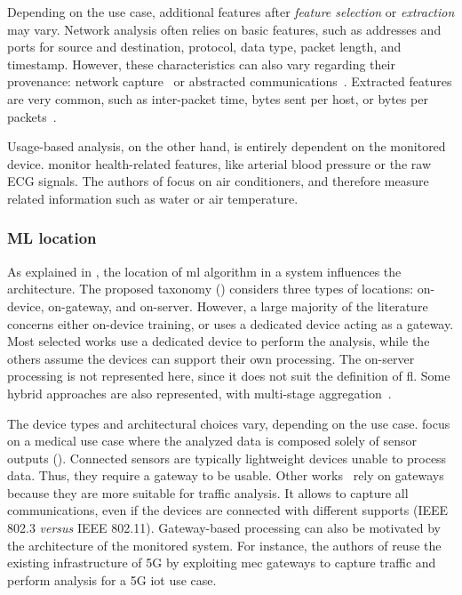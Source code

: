 Depending on the use case, additional features after \emph{feature selection} or \emph{extraction} may vary.
Network analysis often relies on basic features, such as addresses and ports for source and destination, protocol, data type, packet length, and timestamp.
However, these characteristics can also vary regarding their provenance: network capture~\cite{kddcup99,tavallaee_detailedanalysisKDD_2009} or abstracted communications~\cite{pahl_AllEyesYou_2018}.
Extracted features are very common, such as inter-packet time, bytes sent per host, or bytes per packets~\cite{Buczak2016,Chaabouni2019}.

Usage-based analysis, on the other hand, is entirely dependent on the monitored device.
\textcite{schneble_Attackdetectionusing_2019} monitor health-related features, like arterial blood pressure or the raw ECG signals.
The authors of \cite{zhang_BlockchainbasedFederatedLearning_2020} focus on air conditioners, and therefore measure related information such as water or air temperature.

\subsubsection{ML location}
\label{sec:sota.quali.location}

As explained in , the location of \gls{ml} algorithm in a system influences the architecture.
The proposed taxonomy () considers three types of locations: on-device, on-gateway, and on-server.
However, a large majority of the literature concerns either on-device training, or uses a dedicated device acting as a gateway.
Most selected works use a dedicated device to perform the analysis, while the others assume the devices can support their own processing.
The on-server processing is not represented here, since it does not suit the definition of \gls{fl}.
Some hybrid approaches are also represented, with multi-stage aggregation~\cite{liu_BlockchainFederatedLearning_2021}.

The device types and architectural choices vary, depending on the use case.
\textcite{zhang_BlockchainbasedFederatedLearning_2020} focus on a medical use case where the analyzed data is composed solely of sensor outputs ().
Connected sensors are typically lightweight devices unable to process data.
Thus, they require a gateway to be usable.
Other works~\cite{li_DeepFedFederatedDeep_2020,chen_Networkanomalydetection_2020,schneble_Attackdetectionusing_2019,zhao_MultiTaskNetworkAnomaly_2019,Popoola2021,al-athbaal-marri_FederatedMimicLearning_2020, kim_CollaborativeAnomalyDetection_2020,chen_Networkanomalydetection_2020,li_DeepFedFederatedDeep_2020b} rely on gateways because they are more suitable for traffic analysis.
It allows to capture all communications, even if the devices are connected with different supports (\eg IEEE 802.3 \emph{versus} IEEE 802.11).
Gateway-based processing can also be motivated by the architecture of the monitored system.
For instance, the authors of \cite{fan_IoTDefenderFederatedTransfer_2020} reuse the existing infrastructure of 5G by exploiting \gls{mec} gateways to capture traffic and perform analysis for a 5G \gls{iot} use case.



